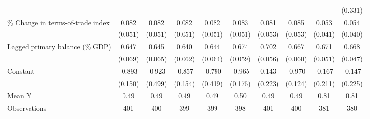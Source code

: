 {\begin{tabular}{l*{9}{c}}
                    &                     &                     &                     &                     &                     &                     &                     &                     &     (0.331)         \\
\addlinespace
\% Change in terms-of-trade index&       0.082         &       0.082         &       0.082         &       0.082         &       0.083         &       0.081         &       0.085         &       0.053         &       0.054         \\
                    &     (0.051)         &     (0.051)         &     (0.051)         &     (0.051)         &     (0.051)         &     (0.053)         &     (0.053)         &     (0.041)         &     (0.040)         \\
\addlinespace
Lagged primary balance (\% GDP)&       0.647\sym{***}&       0.645\sym{***}&       0.640\sym{***}&       0.644\sym{***}&       0.674\sym{***}&       0.702\sym{***}&       0.667\sym{***}&       0.671\sym{***}&       0.668\sym{***}\\
                    &     (0.069)         &     (0.065)         &     (0.062)         &     (0.064)         &     (0.059)         &     (0.056)         &     (0.060)         &     (0.051)         &     (0.047)         \\
\addlinespace
Constant            &      -0.893\sym{***}&      -0.923\sym{*}  &      -0.857\sym{***}&      -0.790\sym{*}  &      -0.965\sym{***}&       0.143         &      -0.970\sym{***}&      -0.167         &      -0.147         \\
                    &     (0.150)         &     (0.499)         &     (0.154)         &     (0.419)         &     (0.175)         &     (0.223)         &     (0.124)         &     (0.211)         &     (0.225)         \\
\midrule
Mean Y              &        0.49         &        0.49         &        0.49         &        0.49         &        0.50         &        0.49         &        0.49         &        0.81         &        0.81         \\
Observations        &         401         &         400         &         399         &         399         &         398         &         401         &         400         &         381         &         380         \\
\bottomrule
\end{tabular}
}

